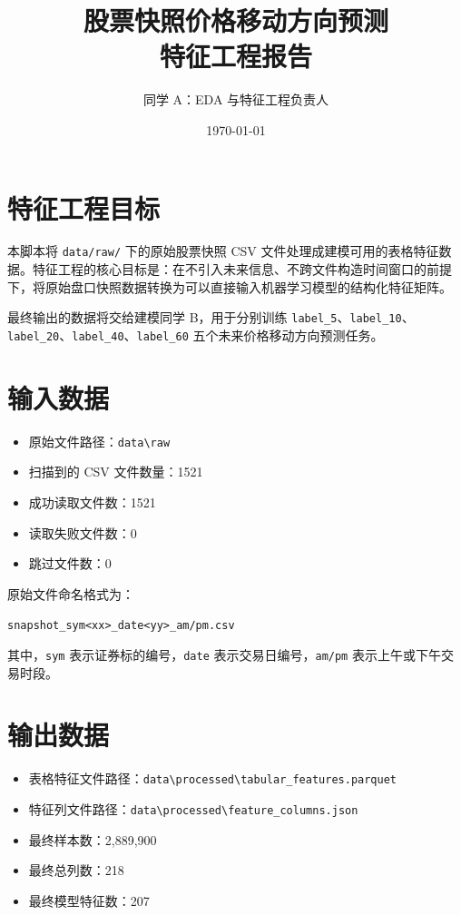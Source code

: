 \documentclass[UTF8,a4paper,12pt]{ctexart}
\title{股票快照价格移动方向预测\\特征工程报告}
\author{同学 A：EDA 与特征工程负责人}
\date{\today}
\begin{document}
\maketitle
\tableofcontents
\newpage

\section{特征工程目标}

本脚本将 \texttt{data/raw/} 下的原始股票快照 CSV 文件处理成建模可用的表格特征数据。特征工程的核心目标是：在不引入未来信息、不跨文件构造时间窗口的前提下，将原始盘口快照数据转换为可以直接输入机器学习模型的结构化特征矩阵。

最终输出的数据将交给建模同学 B，用于分别训练 \texttt{label\_5}、\texttt{label\_10}、\texttt{label\_20}、\texttt{label\_40}、\texttt{label\_60} 五个未来价格移动方向预测任务。

\section{输入数据}

\begin{itemize}
  \item 原始文件路径：\texttt{data\textbackslash raw}
  \item 扫描到的 CSV 文件数量：1521
  \item 成功读取文件数：1521
  \item 读取失败文件数：0
  \item 跳过文件数：0
\end{itemize}

原始文件命名格式为：

\begin{center}
\texttt{snapshot\_sym<xx>\_date<yy>\_am/pm.csv}
\end{center}

其中，\texttt{sym} 表示证券标的编号，\texttt{date} 表示交易日编号，\texttt{am/pm} 表示上午或下午交易时段。

\section{输出数据}

\begin{itemize}
  \item 表格特征文件路径：\texttt{data\textbackslash processed\textbackslash tabular\_features.parquet}
  \item 特征列文件路径：\texttt{data\textbackslash processed\textbackslash feature\_columns.json}
  \item 最终样本数：2,889,900
  \item 最终总列数：218
  \item 最终模型特征数：207
\end{itemize}
\end{document}
